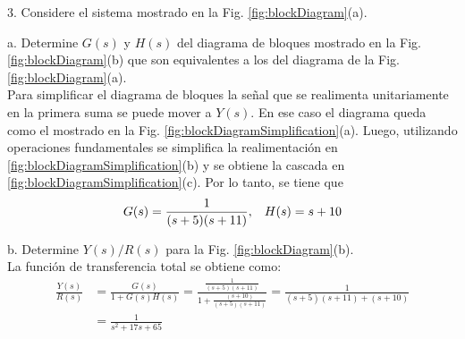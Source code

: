 \documentclass[11pt, spanish]{article}
\begin{document}
\begin{description}
			\item 3. Considere el sistema mostrado en la Fig. \ref{fig:blockDiagram}(a).
			\begin{description}
				\item a. Determine $G(s)$ y $H(s)$ del diagrama de bloques mostrado en la Fig. \ref{fig:blockDiagram}(b) que son equivalentes a los del diagrama de la Fig. \ref{fig:blockDiagram}(a).\\
				Para simplificar el diagrama de bloques la señal que se realimenta unitariamente en la primera suma se puede mover a $Y(s)$. En ese caso el diagrama queda como el mostrado en la Fig. \ref{fig:blockDiagramSimplification}(a). Luego, utilizando operaciones fundamentales se simplifica la realimentación en \ref{fig:blockDiagramSimplification}(b) y se obtiene la cascada en \ref{fig:blockDiagramSimplification}(c). Por lo tanto, se tiene que
				\begin{equation*}
					G(s) = \frac{1}{(s+5)(s+11)}, \hspace*{3mm} H(s) = s+10
				\end{equation*}

				\item b. Determine $Y(s)/R(s)$ para la Fig. \ref{fig:blockDiagram}(b).\\
				La función de transferencia total se obtiene como:
				\begin{align*}
					\frac{Y(s)}{R(s)} &= \frac{G(s)}{1+G(s)H(s)} = \frac{\frac{1}{(s+5)(s+11)}}{1+\frac{(s+10)}{(s+5)(s+11)}} = \frac{1}{(s+5)(s+11)+(s+10)}\\
					&= \frac{1}{s^2+17s+65}
				\end{align*}


\end{description}
\end{description}
\end{document}
